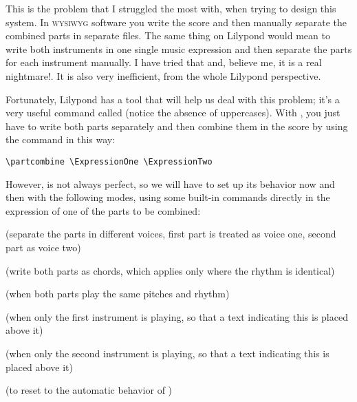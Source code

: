 \documentclass[../../LilyPond-Tutorials]{subfiles}
\begin{document}
This is the problem that I struggled the most with, when trying to design this system.
In \textsc{wysiwyg} software you write the score and then manually separate the combined parts in separate files.
The same thing on Lilypond would mean to write both instruments in one single music expression and then separate the parts for each instrument manually.
I have tried that and, believe me, it is a real nightmare!.
It is also very inefficient, from the whole Lilypond perspective.


Fortunately, Lilypond has a tool that will help us deal with this problem; it's a very useful command called  (notice the absence of uppercases).
With , you just have to write both parts separately and then combine them in the score by using the command in this way:

\begin{verbatim}
\partcombine \ExpressionOne \ExpressionTwo
\end{verbatim}


However,  is not always perfect, so we will have to set up its behavior now and then with the following modes, using some built-in commands directly in the expression of one of the parts to be combined: 

\begin{itemize*}
\item  {} (separate the parts in different voices, first part is treated as voice one, second part as voice two)
\item {} (write both parts as chords, which applies only where the rhythm is identical)
\item {} (when both parts play the same pitches and rhythm)
\item {} (when only the first instrument is playing, so that a text indicating this is placed above it)
\item {} (when only the second instrument is playing, so that a text indicating this is placed above it)
\item {} (to reset to the automatic behavior of )
\end{itemize*}
\end{document}
